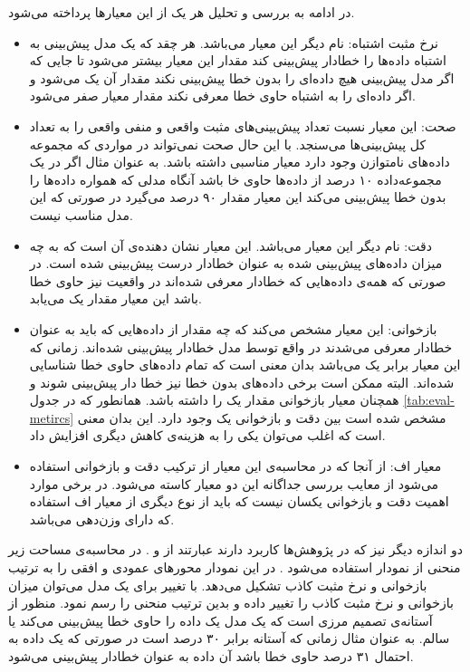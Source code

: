 در ادامه به بررسی و تحلیل هر یک از این معیارها پرداخته می‌شود. 
\begin{itemize}
	\item 
	نرخ مثبت اشتباه: نام دیگر این معیار  می‌باشد. هر چقد که یک مدل پیش‌بینی به اشتباه داده‌ها را خطادار پیش‌بینی کند مقدار این معیار بیشتر می‌شود تا جایی که اگر مدل پیش‌بینی هیچ داده‌ای را بدون خطا پیش‌بینی نکند مقدار آن یک می‌شود و اگر داده‌ای را به اشتباه حاوی خطا معرفی نکند مقدار معیار صفر می‌شود. 
\item 
صحت: این معیار نسبت تعداد پیش‌بینی‌های مثبت واقعی و منفی واقعی را به تعداد کل پیش‌بینی‌ها می‌سنجد. با این حال صحت نمی‌تواند در مواردی که مجموعه داده‌های نا‌متوازن وجود دارد معیار مناسبی داشته باشد. به عنوان مثال اگر در یک مجموعه‌داده ۱۰ درصد از داده‌ها حاوی خا باشد آنگاه مدلی که همواره داده‌ها را بدون خطا پیش‌بینی می‌کند این معیار مقدار ۹۰ درصد می‌گیرد در صورتی که این مدل مناسب نیست. 
\item
دقت: نام دیگر این معیار  می‌باشد. این معیار نشان دهنده‌ی آن است که به چه میزان داده‌های پیش‌بینی شده به عنوان خطادار درست پیش‌بینی شده است.  در صورتی که همه‌ی داده‌هایی که خطادار معرفی شده‌اند در واقعیت نیز حاوی خطا باشد این معیار مقدار یک می‌یابد. 
\item 
بازخوانی: این معیار مشخص می‌کند که چه مقدار از داده‌هایی که باید به عنوان خطادار معرفی می‌شدند در واقع توسط مدل خطادار پیش‌بینی شده‌اند.  زمانی که این معیار برابر یک می‌باشد بدان معنی است که تمام داده‌‌های حاوی خطا شناسایی شده‌اند. البته ممکن است برخی داده‌های بدون خطا نیز خطا دار پیش‌بینی شوند و همچنان معیار بازخوانی مقدار یک را داشته باشد. همانطور که در جدول \ref{tab:eval-metircs} مشخص شده ‌است بین دقت و بازخوانی یک  وجود دارد. این بدان معنی است که اغلب می‌توان یکی را به هزینه‌ی کاهش دیگری افزایش داد. 
\item
معیار اف: از آنجا که در محاسبه‌ی این معیار از ترکیب دقت و بازخوانی استفاده می‌شود از معایب بررسی جداگانه این دو معیار کاسته می‌شود. در برخی موارد اهمیت دقت و بازخوانی یکسان نیست که باید از نوع دیگری از معیار اف استفاده که دارای وزن‌دهی می‌باشد. 
\end{itemize}





دو اندازه دیگر نیز که در پژوهش‌ها کاربرد دارند عبارتند از  و . در محاسبه‌ی مساحت زیر منحنی از  نمودار  استفاده می‌شود . در این نمودار محورهای عمودی و افقی را به ترتیب بازخوانی و  نرخ مثبت کاذب تشکیل می‌دهد.  با تغییر  برای یک مدل می‌توان میزان بازخوانی و  نرخ مثبت کاذب را تغییر داده و بدین ترتیب منحنی را رسم نمود.  منظور از آستانه‌ی تصمیم  مرزی است  که یک مدل یک داده را حاوی خطا پیش‌بینی می‌کند یا سالم. به عنوان مثال زمانی که آستانه برابر ۳۰ درصد است در صورتی که یک داده به احتمال ۳۱ درصد حاوی خطا باشد آن داده به عنوان خطادار پیش‌بینی می‌شود. \\

